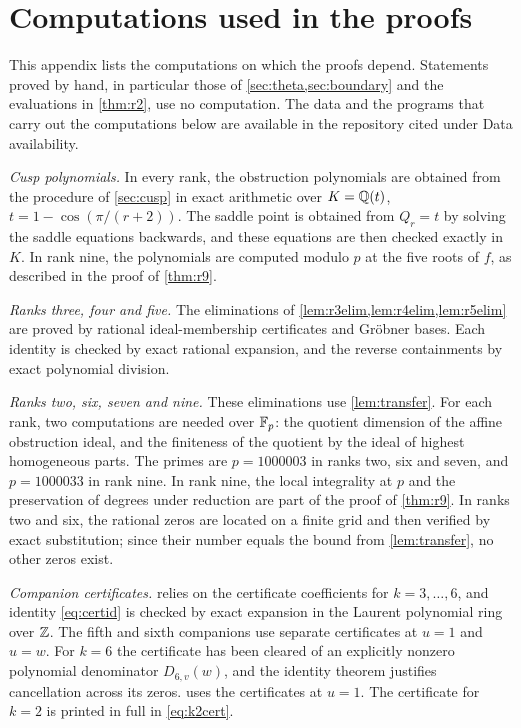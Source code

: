 \section{Computations used in the proofs}\label{app:verification}

This appendix lists the computations on which the proofs depend. Statements proved by hand, in particular those of \cref{sec:theta,sec:boundary} and the evaluations in \cref{thm:r2}, use no computation. The data and the programs that carry out the computations below are available in the repository cited under Data availability.

\emph{Cusp polynomials.} In every rank, the obstruction polynomials are obtained from the procedure of \cref{sec:cusp} in exact arithmetic over $K=\mathbb{Q}(t)$, $t=1-\cos(\pi/(r+2))$. The saddle point is obtained from $Q_r=t$ by solving the saddle equations backwards, and these equations are then checked exactly in $K$. In rank nine, the polynomials are computed modulo $p$ at the five roots of $f$, as described in the proof of \cref{thm:r9}.

\emph{Ranks three, four and five.} The eliminations of \cref{lem:r3elim,lem:r4elim,lem:r5elim} are proved by rational ideal-membership certificates and Gr\"obner bases. Each identity is checked by exact rational expansion, and the reverse containments by exact polynomial division.

\emph{Ranks two, six, seven and nine.} These eliminations use \cref{lem:transfer}. For each rank, two computations are needed over $\mathbb{F}_p$: the quotient dimension of the affine obstruction ideal, and the finiteness of the quotient by the ideal of highest homogeneous parts. The primes are $p=1000003$ in ranks two, six and seven, and $p=1000033$ in rank nine. In rank nine, the local integrality at $p$ and the preservation of degrees under reduction are part of the proof of \cref{thm:r9}. In ranks two and six, the rational zeros are located on a finite grid and then verified by exact substitution; since their number equals the bound from \cref{lem:transfer}, no other zeros exist.

\emph{Companion certificates.}  relies on the certificate coefficients for $k=3,\dots,6$, and identity \eqref{eq:certid} is checked by exact expansion in the Laurent polynomial ring over $\mathbb{Z}$. The fifth and sixth companions use separate certificates at $u=1$ and $u=w$. For $k=6$ the certificate has been cleared of an explicitly nonzero polynomial denominator $D_{6,v}(w)$, and the identity theorem justifies cancellation across its zeros.  uses the certificates at $u=1$. The certificate for $k=2$ is printed in full in \eqref{eq:k2cert}.
